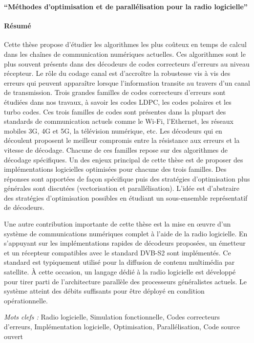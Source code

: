 \documentclass[a4paper, 11pt]{article}
\begin{document}
\thispagestyle{empty}

\noindent
{\large \textbf{``Méthodes d'optimisation et de parallélisation pour la radio
                logicielle''}}

\paragraph{Résumé}

Cette thèse propose d'étudier les algorithmes les plus coûteux en temps de
calcul dans les chaînes de communication numériques actuelles. Ces algorithmes
sont le plus souvent présents dans des décodeurs de codes correcteurs d'erreurs
au niveau récepteur. Le rôle du codage canal est d’accroître la robustesse vis à
vis des erreurs qui peuvent apparaître lorsque l'information transite au travers
d'un canal de transmission. Trois grandes familles de codes correcteurs
d'erreurs sont étudiées dans nos travaux, à savoir les codes LDPC, les codes
polaires et les turbo codes. Ces trois familles de codes sont présentes dans la
plupart des standards de communication actuels comme le Wi-Fi, l’Ethernet, les
réseaux mobiles 3G, 4G et 5G, la télévision numérique, etc. Les décodeurs qui en
découlent proposent le meilleur compromis entre la résistance aux erreurs et la
vitesse de décodage. Chacune de ces familles repose sur des algorithmes de
décodage spécifiques. Un des enjeux principal de cette thèse est de proposer des
implémentations logicielles optimisées pour chacune des trois familles. Des
réponses sont apportées de façon spécifique puis des stratégies d'optimisation
plus générales sont discutées (vectorisation et parallélisation). L'idée est
d'abstraire des stratégies d'optimisation possibles en étudiant un sous-ensemble
représentatif de décodeurs.

Une autre contribution importante de cette thèse est la mise en œuvre d'un
système de communications numériques complet à l'aide de la radio logicielle. En
s’appuyant sur les implémentations rapides de décodeurs proposées, un émetteur
et un récepteur compatibles avec le standard DVB-S2 sont implémentés. Ce
standard est typiquement utilisé pour la diffusion de contenu multimédia par
satellite. À cette occasion, un langage dédié à la radio logicielle est
développé pour tirer parti de l'architecture parallèle des processeurs
généralistes actuels. Le système atteint des débits suffisants pour être déployé
en condition opérationnelle.

\vskip0.5cm
\emph{Mots clefs :} Radio logicielle, Simulation fonctionnelle, Codes
                    correcteurs d'erreurs, Implémentation logicielle,
                    Optimisation, Parallélisation, Code source ouvert
\end{document}
